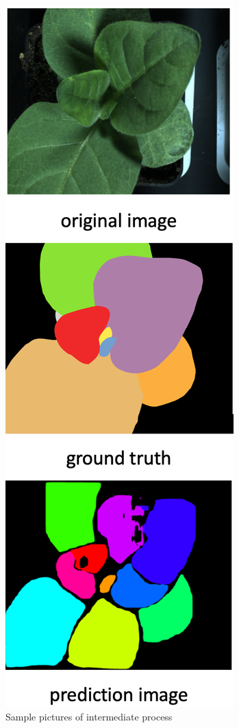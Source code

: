 \documentclass[conference]{IEEEtran}
\begin{document}
\begin{figure}[htbp]
\centerline{\includegraphics[scale=0.55]{T33.png}}
\caption{Sample pictures of intermediate process }
\label{fig7}
\end{figure}
\end{document}
